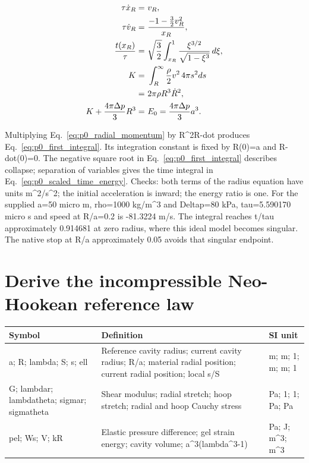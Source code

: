 \documentclass[11pt]{article}
\begin{document}
\begin{align}
\tau\dot x_R= & ~v_R, \notag \\
\tau\dot v_R= & ~\frac{-1-\frac32v_R^2}{x_R}, \notag \\
\frac{t(x_R)}{\tau}= & ~\sqrt{\frac32}\int_{x_R}^{1}\frac{\xi^{3/2}}{\sqrt{1-\xi^3}}\,d\xi, \notag \\
K= & ~\int_R^\infty\frac\rho2v^2\,4\pi s^2ds \notag \\
= & ~2\pi\rho R^3\dot R^2, \notag \\
K+\frac{4\pi\Delta p}{3}R^3= & ~E_0=\frac{4\pi\Delta p}{3}a^3. \label{eq:p0_scaled_time_energy}
\end{align}

Multiplying Eq.~\eqref{eq:p0_radial_momentum} by R\textasciicircum{}2R-dot produces Eq.~\eqref{eq:p0_first_integral}. Its integration constant is fixed by R(0)=a and R-dot(0)=0. The negative square root in Eq.~\eqref{eq:p0_first_integral} describes collapse; separation of variables gives the time integral in Eq.~\eqref{eq:p0_scaled_time_energy}. Checks: both terms of the radius equation have units m\textasciicircum{}2/s\textasciicircum{}2; the initial acceleration is inward; the energy ratio is one. For the supplied a=50  micro m, rho=1000 kg/m\textasciicircum{}3 and Deltap=80 kPa, tau=5.590170  micro s and speed at R/a=0.2 is -81.3224 m/s. The integral reaches t/tau approximately 0.914681 at zero radius, where this ideal model becomes singular. The native stop at R/a approximately 0.05 avoids that singular endpoint.

\section{Derive the incompressible Neo-Hookean reference law}\label{sec:gel-law}

\begin{longtable}{p{.18\linewidth}p{.60\linewidth}p{.15\linewidth}}Symbol & Definition & SI unit\\\hline

a; R; lambda; S; s; ell & Reference cavity radius; current cavity radius; R/a; material radial position; current radial position; local s/S & m; m; 1; m; m; 1\\

G; lambdar; lambdatheta; sigmar; sigmatheta & Shear modulus; radial stretch; hoop stretch; radial and hoop Cauchy stress & Pa; 1; 1; Pa; Pa\\

pel; Ws; V; kR & Elastic pressure difference; gel strain energy; cavity volume; a\textasciicircum{}3(lambda\textasciicircum{}3-1) & Pa; J; m\textasciicircum{}3; m\textasciicircum{}3\\

\end{longtable}
\end{document}
